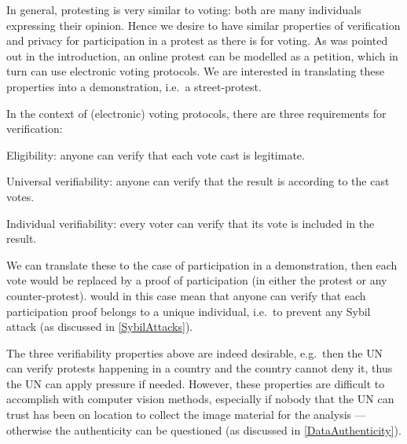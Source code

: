 In general, protesting is very similar to voting: both are many individuals 
expressing their opinion.
Hence we desire to have similar properties of verification and privacy for 
participation in a protest as there is for voting.
As was pointed out in the introduction, an online protest can be modelled as 
a petition, which in turn can use electronic voting protocols.
We are interested in translating these properties into a demonstration, i.e.\ 
a street-protest.

In the context of (electronic) voting protocols, there are three requirements 
for verification:
\begin{requirements}[V]
\item\label{EligibilityVerif} Eligibility: anyone can verify that each vote 
  cast is legitimate.
\item\label{UniversalVerif} Universal verifiability: anyone can verify that the 
  result is according to the cast votes.
\item\label{IndividualVerif} Individual verifiability: every voter can verify 
  that its vote is included in the result.
\end{requirements}
We can translate these to the case of participation in a demonstration, then 
each vote would be replaced by a proof of participation (in either the protest 
or any counter-protest).
 would in this case mean that anyone can verify that 
each participation proof belongs to a unique individual, i.e.\ to prevent any 
Sybil attack (as discussed in \cref{SybilAttacks}).

The three verifiability properties above are indeed desirable, e.g.\ then the 
\ac{UN} can verify protests happening in a country and the country cannot deny 
it, thus the \ac{UN} can apply pressure if needed.
However, these properties are difficult to accomplish with computer vision 
methods, especially if nobody that the \ac{UN} can trust has been on location 
to collect the image material for the analysis --- otherwise the authenticity 
can be questioned (as discussed in \cref{DataAuthenticity}).

